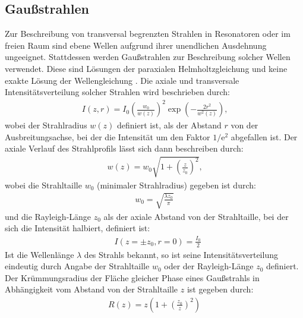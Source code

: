 \documentclass[11pt, a4paper]{article}
\numberwithin{equation}{section}
\begin{document}
\subsection{Gaußstrahlen}
\label{gaussstrahlen}
Zur Beschreibung von transversal begrenzten Strahlen in Resonatoren oder im freien Raum sind ebene Wellen aufgrund ihrer unendlichen Ausdehnung ungeeignet.
Stattdessen werden Gaußstrahlen zur Beschreibung solcher Wellen verwendet.
Diese sind Lösungen der paraxialen Helmholtzgleichung und keine exakte Lösung der Wellengleichung \cite{linden}.
Die axiale und transversale Intensitätsverteilung solcher Strahlen wird beschrieben durch:
\begin{align}
	I(z,r) = I_0 \left( \frac{w_0}{w(z)} \right)^2 \exp\left(- \frac{2 r^2}{w^2(z)} \right) \text{,}
\end{align}
wobei der Strahlradius $w(z)$ definiert ist, als der Abstand $r$ von der Ausbreitungsachse, bei der die Intensität um den Faktor $1/ \mathrm{e}^2$ abgefallen ist.
Der axiale Verlauf des Strahlprofils lässt sich dann beschreiben durch:
\begin{align}
	w(z) = w_0 \sqrt{1 + \left( \frac{z}{z_0} \right)^2} \text{,}
	\label{eq:gauss_axialprofil}
\end{align}
wobei die Strahltaille $w_0$ (minimaler Strahlradius) gegeben ist durch:
\begin{align}
	w_0 = \sqrt{\frac{\lambda z_0}{\pi}}
	\label{eq:rayleigh_laenge}
\end{align}
und die Rayleigh-Länge $z_0$ als der axiale Abstand von der Strahltaille, bei der sich die Intensität halbiert, definiert ist:
\begin{align}
	&I(z = \pm z_0, r =0) = \frac{I_0}{2}
\end{align}
Ist die Wellenlänge $\lambda$ des Strahls bekannt, so ist seine Intensitätsverteilung eindeutig durch Angabe der Strahltaille $w_0$ oder der Rayleigh-Länge $z_0$ definiert.
Der Krümmungsradius der Fläche gleicher Phase eines Gaußstrahls in Abhängigkeit vom Abstand von der Strahltaille $z$ ist gegeben durch:
\begin{align}
	R(z) = z \left( 1 + \left( \frac{z_0}{z} \right)^2 \right)
\end{align}
\end{document}
